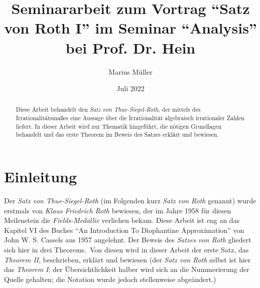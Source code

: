 \documentclass[11pt]{article}
\title{Seminararbeit zum Vortrag ``Satz von Roth I'' im Seminar ``Analysis'' bei Prof. Dr. Hein}
\author{Marius Müller}
\date{Juli 2022}
\begin{document}
    \maketitle

    \vfill

    \begin{abstract}
        \noindent \textrm{Diese Arbeit behandelt den \emph{Satz von Thue-Siegel-Roth}, der mittels des Irrationalitätsmaßes
        eine Aussage über die Irrationalität algebraisch irrationaler Zahlen liefert.
        \newline
        In dieser Arbeit wird zur Thematik hingeführt, die nötigen Grundlagen behandelt und das erste Theorem im Beweis
        des Satzes erklärt und bewiesen.}
    \end{abstract}

    \newpage

    \tableofcontents

    \newpage

    \section{Einleitung}
    \label{sec:intro}
        \textrm{Der \emph{Satz von Thue-Siegel-Roth} (im Folgenden kurz \emph{Satz von Roth} genannt) wurde erstmals von
        \emph{Klaus Friedrich Roth} bewiesen, der im Jahre 1958 für diesen Meilenstein die \emph{Fields-Medallie}
        verliehen bekam.
        \newline
        Diese Arbeit ist eng an das Kapitel VI des Buches ``An Introduction To Diophantine Approximation'' von
        John W. S. Cassels aus 1957 angelehnt.
        \newline
        Der Beweis des \emph{Satzes von Roth} gliedert sich hier in drei Theorems.\ Von diesen wird in dieser
        Arbeit der erste Satz, das \emph{Theorem II}, beschrieben, erklärt und bewiesen (der \emph{Satz von Roth} selbst
        ist hier das \emph{Theorem I}; der Übersichtlichkeit halber wird sich an die Nummerierung der Quelle gehalten;
        die Notation wurde jedoch stellenweise abgeändert.)}

    
    
    

    
        
\end{document}
